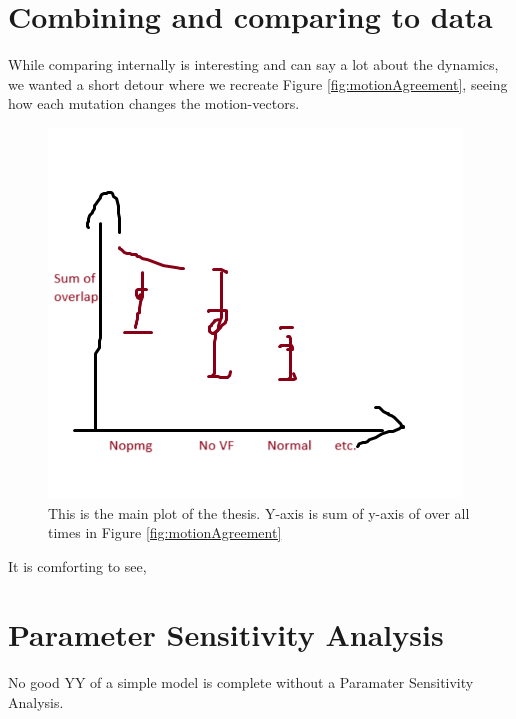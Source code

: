 
\section{Combining and comparing to data}
While comparing internally is interesting and can say a lot about the dynamics, we wanted a short detour where we recreate Figure \ref{fig:motionAgreement}, seeing how each mutation changes the motion-vectors.

\begin{figure}[H]
    \centering
    \includegraphics[width=1.3\linewidth]{chapters/Theory/figures/MutantDifference_Placeholder.png}
    \caption{This is the main plot of the thesis. Y-axis is sum of y-axis of over all times in Figure \ref{fig:motionAgreement}}
    \label{fig:enter-label}
\end{figure}
It is comforting to see,

\section{Parameter Sensitivity Analysis}
No good YY of a simple model is complete without a Paramater Sensitivity Analysis.





